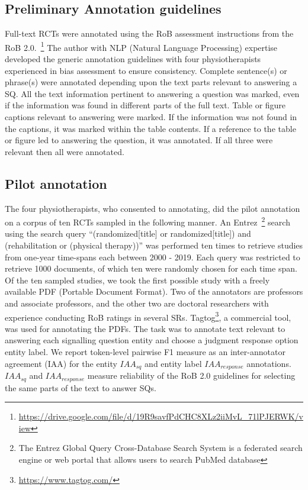 \documentclass{IOS-Book-Article}
\begin{document}
\subsection{Preliminary Annotation guidelines}
\label{subsec:annot_guide}
%
Full-text RCTs were annotated using the RoB assessment instructions from the RoB 2.0.~\footnote{\url{https://drive.google.com/file/d/19R9savfPdCHC8XLz2iiMvL_71lPJERWK/view}}
The author with NLP (Natural Language Processing) expertise developed the generic annotation guidelines with four physiotherapists experienced in bias assessment to ensure consistency.
Complete sentence(s) or phrase(s) were annotated depending upon the text parts relevant to answering a SQ.
All the text information pertinent to answering a question was marked, even if the information was found in different parts of the full text.
Table or figure captions relevant to answering were marked.
If the information was not found in the captions, it was marked within the table contents.
If a reference to the table or figure led to answering the question, it was annotated.
If all three were relevant then all were annotated.
%
\subsection{Pilot annotation}
\label{subsec:annotation}
%
The four physiotherapists, who consented to annotating, did the pilot annotation on a corpus of ten RCTs sampled in the following manner.
An Entrez~\footnote{The Entrez Global Query Cross-Database Search System is a federated search engine or web portal that allows users to search PubMed database} search using the search query ``{\selectfont (randomized[title] or randomized[title]) and (rehabilitation or (physical therapy))}'' was performed ten times to retrieve studies from one-year time-spans each between 2000 - 2019.
Each query was restricted to retrieve 1000 documents, of which ten were randomly chosen for each time span.
Of the ten sampled studies, we took the first possible study with a freely available PDF (Portable Document Format).
Two of the annotators are professors and associate professors, and the other two are doctoral researchers with experience conducting RoB ratings in several SRs.
Tagtog\footnote{\url{https://www.tagtog.com/}}, a commercial tool, was used for annotating the PDFs.
The task was to annotate text relevant to answering each signalling question entity and choose a judgment response option entity label.
We report token-level pairwise F1 measure as an inter-annotator agreement (IAA) for the entity $IAA_{sq}$ and entity label $IAA_{response}$ annotations.~\cite{deleger2012building}
$IAA_{sq}$ and $IAA_{response}$ measure reliability of the RoB 2.0 guidelines for selecting the same parts of the text to answer SQs.
%
%
%
\end{document}
